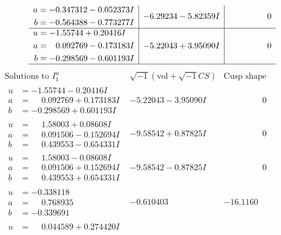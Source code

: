 \documentclass[1p]{elsarticle_modified}
\theoremstyle{definition}
\newcommand{\I}{\sqrt{-1}}
\begin{document}
$$\begin{array}{c|c|c}
\begin{aligned}
a &= -0.347312 - 0.052373 I \\
b &= -0.564388 - 0.773277 I\end{aligned}
 & -6.29234 - 5.82359 I & \phantom{-0.000000 } 0 \\ \hline\begin{aligned}
u &= -1.55744 + 0.20416 I \\
a &= \phantom{-}0.092769 - 0.173183 I \\
b &= -0.298569 - 0.601193 I\end{aligned}
 & -5.22043 + 3.95090 I & \phantom{-0.000000 } 0\\
 \hline 
 \end{array}$$\newpage$$\begin{array}{c|c|c}  
\text{Solutions to }I^u_{1}& \I (\text{vol} + \sqrt{-1}CS) & \text{Cusp shape}\\
 \hline 
\begin{aligned}
u &= -1.55744 - 0.20416 I \\
a &= \phantom{-}0.092769 + 0.173183 I \\
b &= -0.298569 + 0.601193 I\end{aligned}
 & -5.22043 - 3.95090 I & \phantom{-0.000000 } 0 \\ \hline\begin{aligned}
u &= \phantom{-}1.58003 + 0.08608 I \\
a &= \phantom{-}0.091506 - 0.152694 I \\
b &= \phantom{-}0.439553 - 0.654331 I\end{aligned}
 & -9.58542 + 0.87825 I & \phantom{-0.000000 } 0 \\ \hline\begin{aligned}
u &= \phantom{-}1.58003 - 0.08608 I \\
a &= \phantom{-}0.091506 + 0.152694 I \\
b &= \phantom{-}0.439553 + 0.654331 I\end{aligned}
 & -9.58542 - 0.87825 I & \phantom{-0.000000 } 0 \\ \hline\begin{aligned}
u &= -0.338118\phantom{ +0.000000I} \\
a &= \phantom{-}0.768935\phantom{ +0.000000I} \\
b &= -0.339691\phantom{ +0.000000I}\end{aligned}
 & -0.610403\phantom{ +0.000000I} & -16.1160\phantom{ +0.000000I} \\ \hline\begin{aligned}
u &= \phantom{-}0.044589 + 0.274420 I \\

\end{aligned}
\end{array}$$
\end{document}
